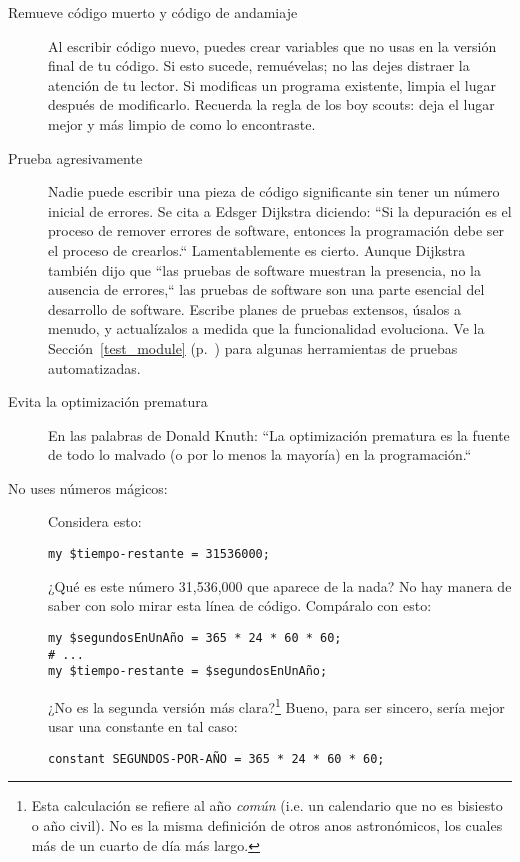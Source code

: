\begin{description}
\item[Remueve código muerto y código de andamiaje]
Al escribir código nuevo, puedes crear variables que no 
usas en la versión final de tu código. Si esto sucede, 
remuévelas; no las dejes distraer la atención de tu lector. 
Si modificas un programa existente, limpia el lugar después
de modificarlo. Recuerda la regla de los boy scouts: 
deja el lugar mejor y más limpio de como lo encontraste.

\item[Prueba agresivamente] Nadie puede escribir una pieza de
código significante sin tener un número inicial de errores.
Se cita a Edsger Dijkstra diciendo: ``Si la depuración 
es el proceso de remover errores de software, entonces
la programación debe ser el proceso de crearlos.``
Lamentablemente es cierto. Aunque Dijkstra también dijo
que ``las pruebas de software muestran la presencia, no la ausencia de
errores,`` las pruebas de software son una parte esencial del
desarrollo de software. Escribe planes de pruebas extensos, úsalos
a menudo, y actualízalos a medida que la funcionalidad evoluciona.
Ve la Sección~\ref{test_module} (p.~\pageref{test_module}) para algunas herramientas 
de pruebas automatizadas.

\item[Evita la optimización prematura] En las palabras de
Donald Knuth: ``La optimización prematura es la fuente de todo lo 
malvado (o por lo menos la mayoría) en la programación.``

\item[No uses números mágicos:] Considera esto:
\begin{verbatim}
my $tiempo-restante = 31536000;
\end{verbatim}

¿Qué es este número 31,536,000 que aparece de la nada?
No hay manera de saber con solo mirar esta línea de código.
Compáralo con esto:

\begin{verbatim}
my $segundosEnUnAño = 365 * 24 * 60 * 60;
# ...
my $tiempo-restante = $segundosEnUnAño;
\end{verbatim}

¿No es la segunda versión más clara?\footnote{Esta calculación se refiere al año \emph{común} (i.e. un calendario que no es bisiesto o año civil). No es la misma definición de otros
anos astronómicos, los cuales más de un cuarto de día más largo.} Bueno, para
ser sincero, sería mejor usar una constante en tal caso:
\begin{verbatim}
constant SEGUNDOS-POR-AÑO = 365 * 24 * 60 * 60;
\end{verbatim}


\end{description}
